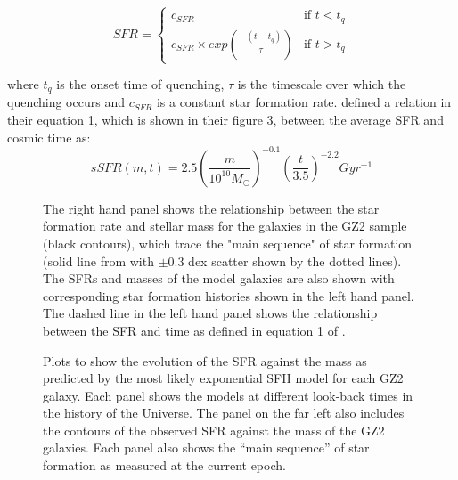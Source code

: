 \documentclass{mn2e}
\begin{document}
\[
SFR = 
\begin{cases}
c_{SFR} & \text{if } t < t_{q} \\
c_{SFR} \times exp{\left( \frac{-(t-t_{q})}{\tau}\right)} & \text{if } t > t_{q}
\end{cases}
\]

where $t_{q}$ is the onset time of quenching, $\tau$ is the timescale over which the quenching occurs and $c_{SFR}$ is a constant star formation rate. \citet{Peng} defined a relation in their equation 1, which is shown in their figure 3, between the average SFR and cosmic time as:
\begin{equation*}
sSFR(m,t) = 2.5 \left( \frac{m}{10^{10} M_{\odot}} \right)^{-0.1} \left(\frac{t}{3.5}\right)^{-2.2} Gyr^{-1}
\end{equation*}

\begin{figure}
\caption{The right hand panel shows the relationship between the star formation rate and stellar mass for the galaxies in the GZ2 sample (black contours), which trace the "main sequence" of star formation (solid line from \cite{Peng} with $\pm0.3$ dex scatter shown by the dotted lines). The SFRs and masses of the model galaxies are also shown with corresponding star formation histories shown in the left hand panel. The dashed line in the left hand panel shows the relationship between the SFR and time as defined in equation 1 of \citet{Peng}.}
\label{sfr_mass}
\end{figure}

\begin{figure}
\caption{Plots to show the evolution of the SFR against the mass as predicted by the most likely exponential SFH model for each GZ2 galaxy. Each panel shows the models at different look-back times in the history of the Universe. The panel on the far left also includes the contours of the observed SFR against the mass of the GZ2 galaxies. Each panel also shows the ``main sequence'' of star formation as measured at the current epoch.}
\label{sfr_mass_evo}
\end{figure}
\end{document}
